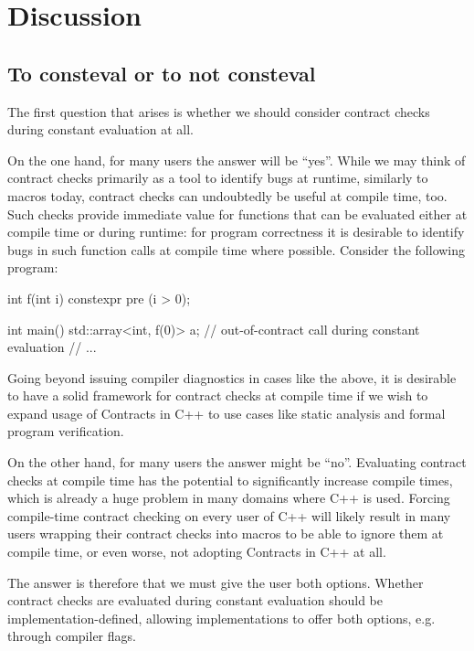 
\section{Discussion}

\subsection{To consteval or to not consteval}

The first question that arises is whether we should consider contract checks during constant evaluation at all.

On the one hand, for many users the answer will be ``yes''. While we may think of contract checks primarily as a tool to identify bugs at runtime, similarly to  macros today, contract checks can undoubtedly be useful at compile time, too. Such checks provide immediate value for  functions that can be evaluated either at compile time or during runtime: for program correctness it is desirable to identify bugs in such function calls at compile time where possible. Consider the following program:

\begin{codeblock}
int f(int i) constexpr 
  pre (i > 0);

int main() {
  std::array<int, f(0)> a;  // out-of-contract call during constant evaluation
  // ...
}
\end{codeblock}

Going beyond issuing compiler diagnostics in cases like the above, it is desirable to have a solid framework for contract checks at compile time if we wish to expand usage of Contracts in C++ to use cases like static analysis and formal program verification. 

On the other hand, for many users the answer might be ``no''. Evaluating contract checks at compile time has the potential to significantly increase compile times, which is already a huge problem in many domains where C++ is used. Forcing compile-time contract checking on every user of C++ will likely result in many users wrapping their contract checks into macros to be able to ignore them at compile time, or even worse, not adopting Contracts in C++ at all.

The answer is therefore that we must give the user both options. Whether contract checks are evaluated during constant evaluation should be implementation-defined, allowing implementations to offer both options, e.g. through compiler flags.

